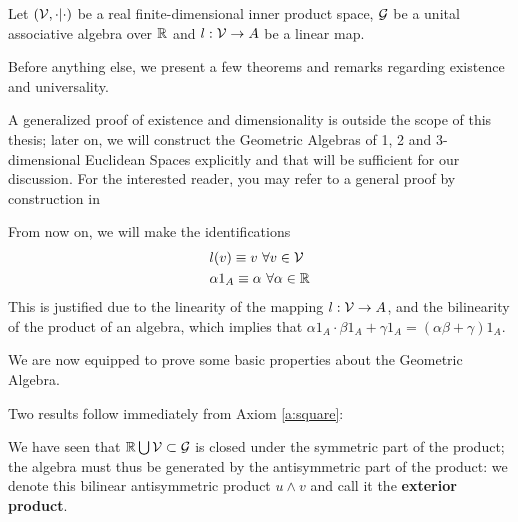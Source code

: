 Let $(\mathcal{V}, \cdot|\cdot )$ be a real finite-dimensional inner product space, $\mathcal{G}$ be a unital associative algebra over $\mathbb{R}$ and $l: \mathcal{V} \to A$ be a linear map.



Before anything else, we present a few theorems and remarks regarding existence and universality.




A generalized proof of existence and dimensionality is outside the scope of this thesis; later on, we will construct the Geometric Algebras of 1, 2 and 3-dimensional Euclidean Spaces explicitly and that will be sufficient for our discussion. For the interested reader, you may refer to a general proof by construction in \cite[Section 3.2]{clifford-algebra}

\begin{remark}
	From now on, we will make the identifications
	\begin{align*}
		&l(v) \equiv v \ \forall v \in \mathcal{V} \\
		&\alpha 1_A \equiv \alpha \ \forall \alpha \in \mathbb{R}
	\end{align*}
	This is justified due to the linearity of the mapping $l: \mathcal{V} \to A$, and the bilinearity of the product of an algebra, which implies that $\alpha 1_A \cdot \beta 1_A  + \gamma 1_A = (\alpha \beta + \gamma) 1_A$.
\end{remark}

We are now equipped to prove some basic properties about the Geometric Algebra.

Two results follow immediately from Axiom \ref{a:square}:





\begin{remark}
	We have seen that $\mathbb{R} \bigcup \mathcal{V} \subset \mathcal{G}$ is closed under the symmetric part of the product; the algebra must thus be generated by the antisymmetric part of the product: we denote this bilinear antisymmetric product $u \wedge v$ and call it the \textbf{exterior product}.
\end{remark}
%
%
%

